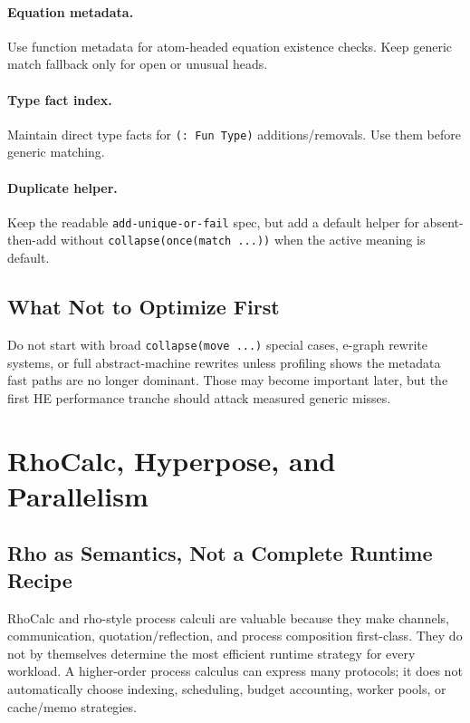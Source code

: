 \documentclass[11pt]{article}
\newcommand{\RhoCalc}{RhoCalc}
\begin{document}
\paragraph{Equation metadata.}  Use function metadata for atom-headed equation existence checks.  Keep generic match fallback only for open or unusual heads.

\paragraph{Type fact index.}  Maintain direct type facts for \texttt{(: Fun Type)} additions/removals.  Use them before generic matching.

\paragraph{Duplicate helper.}  Keep the readable \texttt{add-unique-or-fail} spec, but add a default helper for absent-then-add without \texttt{collapse(once(match ...))} when the active meaning is default.

\subsection{What Not to Optimize First}

Do not start with broad \texttt{collapse(move ...)} special cases, e-graph rewrite systems, or full abstract-machine rewrites unless profiling shows the metadata fast paths are no longer dominant.  Those may become important later, but the first HE performance tranche should attack measured generic misses.

\section{RhoCalc, Hyperpose, and Parallelism}\label{sec:rho}

\subsection{Rho as Semantics, Not a Complete Runtime Recipe}

\RhoCalc{} and rho-style process calculi are valuable because they make channels, communication, quotation/reflection, and process composition first-class.  They do not by themselves determine the most efficient runtime strategy for every workload.  A higher-order process calculus can express many protocols; it does not automatically choose indexing, scheduling, budget accounting, worker pools, or cache/memo strategies.
\end{document}

